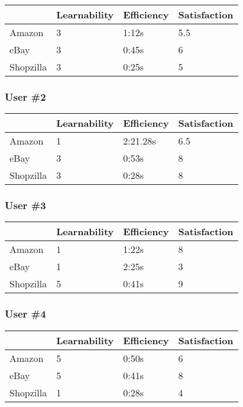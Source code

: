 \documentclass[11pt, oneside]{article}   	%
\begin{document}
\begin{tabular}{| l | l | l | l |}
    \hline
     & Learnability & Efficiency & Satisfaction \\ \hline
    Amazon & 3 & 1:12s & 5.5 \\ \hline
    eBay & 3 & 0:45s & 6 \\ \hline
    Shopzilla & 3 & 0:25s & 5 \\\hline
\end{tabular}

\subsubsection{User \#2}

\begin{tabular}{| l | l | l | l |}
    \hline
     & Learnability & Efficiency & Satisfaction \\ \hline
    Amazon & 1 & 2:21.28s & 6.5 \\ \hline
    eBay & 3 & 0:53s & 8 \\ \hline
    Shopzilla & 3 & 0:28s & 8 \\\hline
\end{tabular}

\subsubsection{User \#3}

\begin{tabular}{| l | l | l | l |}
    \hline
     & Learnability & Efficiency & Satisfaction \\ \hline
    Amazon & 1 & 1:22s & 8 \\ \hline
    eBay & 1 & 2:25s & 3 \\ \hline
    Shopzilla & 5 & 0:41s & 9 \\\hline
\end{tabular}

\subsubsection{User \#4}

\begin{tabular}{| l | l | l | l |}
    \hline
     & Learnability & Efficiency & Satisfaction \\ \hline
    Amazon & 5 & 0:50s & 6 \\ \hline
    eBay & 5 & 0:41s & 8 \\ \hline
    Shopzilla & 1 & 0:28s & 4 \\\hline
\end{tabular}
\end{document}
